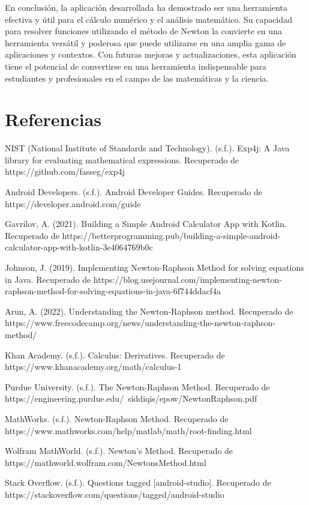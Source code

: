 \documentclass[conference]{IEEEtran}
\begin{document}
En conclusión, la aplicación desarrollada ha demostrado ser una herramienta efectiva y útil para el cálculo numérico y el análisis matemático. Su capacidad para resolver funciones utilizando el método de Newton la convierte en una herramienta versátil y poderosa que puede utilizarse en una amplia gama de aplicaciones y contextos. Con futuras mejoras y actualizaciones, esta aplicación tiene el potencial de convertirse en una herramienta indispensable para estudiantes y profesionales en el campo de las matemáticas y la ciencia.




\section{Referencias}
NIST (National Institute of Standards and Technology). (s.f.). Exp4j: A Java library for evaluating mathematical expressions. Recuperado de https://github.com/fasseg/exp4j

Android Developers. (s.f.). Android Developer Guides. Recuperado de https://developer.android.com/guide

Gavrilov, A. (2021). Building a Simple Android Calculator App with Kotlin. Recuperado de https://betterprogramming.pub/building-a-simple-android-calculator-app-with-kotlin-3e4064769b0c

Johnson, J. (2019). Implementing Newton-Raphson Method for solving equations in Java. Recuperado de https://blog.usejournal.com/implementing-newton-raphson-method-for-solving-equations-in-java-6f744ddacf4a

Arun, A. (2022). Understanding the Newton-Raphson method. Recuperado de https://www.freecodecamp.org/news/understanding-the-newton-raphson-method/

Khan Academy. (s.f.). Calculus: Derivatives. Recuperado de https://www.khanacademy.org/math/calculus-1

Purdue University. (s.f.). The Newton-Raphson Method. Recuperado de https://engineering.purdue.edu/~siddiqis/epow/NewtonRaphson.pdf

MathWorks. (s.f.). Newton-Raphson Method. Recuperado de https://www.mathworks.com/help/matlab/math/root-finding.html

Wolfram MathWorld. (s.f.). Newton's Method. Recuperado de https://mathworld.wolfram.com/NewtonsMethod.html

Stack Overflow. (s.f.). Questions tagged [android-studio]. Recuperado de https://stackoverflow.com/questions/tagged/android-studio
\end{document}
